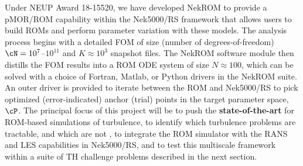   Under NEUP Award 18-15520, we have developed NekROM to provide a pMOR/ROM
capability within the Nek5000/RS framework that allows users to build ROMs and
perform parameter variation with these models.  The analysis process begins
with a detailed FOM of size (number of degrees-of-freedom)
$\cN=10^7$--$10^{11}$ and $K \approx 10^3$ snapshot files.  The NekROM software
module then distills the FOM results into a ROM ODE system of size $N \approx
100$, which can be solved with a choice of Fortran, Matlab, or Python drivers
in the NekROM suite.  An outer driver is provided to iterate between the ROM
and Nek5000/RS to pick optimized (error-indicated) anchor (trial) points in the
target parameter space, $\cP$.
  The principal focus of this project will be to push the \textbf{state-of-the-art} 
for ROM-based simulations of turbulence, to identify which turbulence problems are
tractable, and which are not \cite{tsai22a}, to integrate the ROM simulator with
the RANS and LES capabilities in Nek5000/RS, and to test this multiscale 
framework within a suite of TH challenge problems described in the next section.



